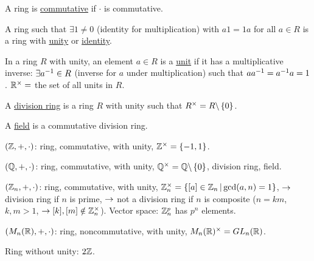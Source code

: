 \documentclass[]{article}
\begin{document}
\begin{definition}
	A ring is \ul{commutative} if $\cdot$ is commutative.
\end{definition}
\begin{definition}
	A ring such that $\exists 1\neq 0$ (identity for multiplication) with $a1=1a$ for all $a\in R$ is a ring with \ul{unity} or \ul{identity}.
\end{definition}
\begin{definition}
	In a ring $R$ with unity, an element $a\in R$ is a \ul{unit} if it has a multiplicative inverse: $\exists a^{-1}\in R$ (inverse for $a$ under multiplication) such that $aa^{-1}=a^{-1} a = 1$.
	$\mathbb{R}^\times = $ the set of all units in $R$.
\end{definition}
\begin{definition}
	A \ul{division ring} is a ring $R$ with unity such that $R^\times = R\backslash\left\{ 0 \right\}$.
\end{definition}
\begin{definition}
	A \ul{field} is a commutative division ring.
\end{definition}

\begin{example}
	$(\mathbb{Z},+,\cdot)$: ring, commutative, with unity, $\mathbb{Z}^\times=\left\{ -1,1 \right\}$.
\end{example}
\begin{example}
	$(\mathbb{Q},+,\cdot)$: ring, commutative, with unity, $\mathbb{Q}^\times=\mathbb{Q}\backslash\left\{ 0 \right\}$, division ring, field.
\end{example}
\begin{example}
	$(\mathbb{Z}_n,+,\cdot)$: ring, commutative, with unity, $\mathbb{Z}_n^\times=\left\{ [a]\in \mathbb{Z}_n \, \middle| \, \gcd(a,n)=1 \right\}$, $\rightarrow$ division ring if $n$ is prime, $\rightarrow$ not a division ring if $n$ is composite ($n=km$, $k,m>1$, $\rightarrow[k],[m]\notin\mathbb{Z}_n^\times$).
	Vector space: $\mathbb{Z}_n^p$ has $p^n$ elements.
\end{example}
\begin{example}
	$(M_n(\mathbb{R}),+,\cdot)$: ring, noncommutative, with unity, $M_n(\mathbb{R})^\times = GL_n(\mathbb{R})$.
\end{example}
\begin{example}
	Ring without unity: $2\mathbb{Z}$.
\end{example}
\end{document}
